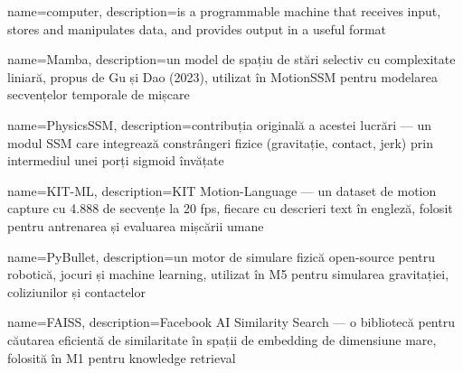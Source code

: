 {
  name=computer,
  description={is a programmable machine that receives input,
               stores and manipulates data, and provides
               output in a useful format}
}





{
  name=Mamba,
  description={un model de spațiu de stări selectiv cu complexitate liniară,
               propus de Gu și Dao (2023), utilizat în MotionSSM pentru
               modelarea secvențelor temporale de mișcare}
}

{
  name=PhysicsSSM,
  description={contribuția originală a acestei lucrări --- un modul SSM care
               integrează constrângeri fizice (gravitație, contact, jerk)
               prin intermediul unei porți sigmoid învățate}
}

{
  name=KIT-ML,
  description={KIT Motion-Language --- un dataset de motion capture cu 4.888
               de secvențe la 20 fps, fiecare cu descrieri text în engleză,
               folosit pentru antrenarea și evaluarea mișcării umane}
}

{
  name=PyBullet,
  description={un motor de simulare fizică open-source pentru robotică,
               jocuri și machine learning, utilizat în M5 pentru simularea
               gravitației, coliziunilor și contactelor}
}

{
  name=FAISS,
  description={Facebook AI Similarity Search --- o bibliotecă pentru
               căutarea eficientă de similaritate în spații de embedding
               de dimensiune mare, folosită în M1 pentru knowledge retrieval}
}

